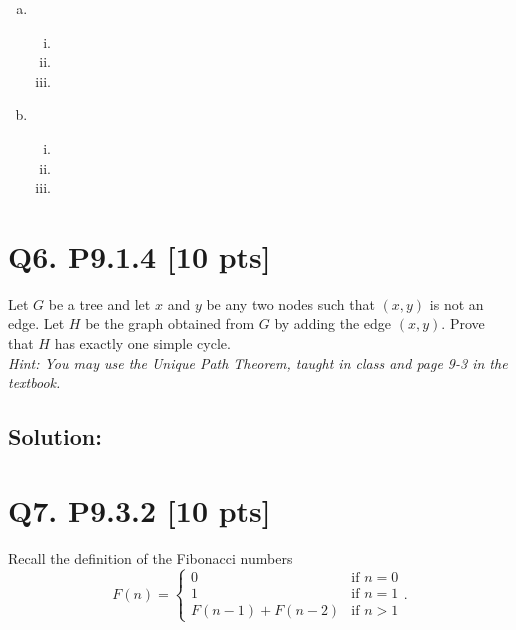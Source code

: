 \documentclass[12pt]{article}
\begin{document}
\begin{enumerate}[(a)]
    \item \ 
        \begin{enumerate}[(i)]
            \item 
            \item 
            \item 
        \end{enumerate}
    \item \ 
        \begin{enumerate}[(i)]
            \item 
            \item 
            \item 
        \end{enumerate}
\end{enumerate}


\newpage

\section*{\textbf{Q6. P9.1.4} [10 pts]}
 Let $G$ be a tree and let $x$ and $y$ be any two nodes such that $(x, y)$ is not an edge. Let $H$ be the graph obtained from $G$ by adding the edge $(x, y)$. Prove that $H$ has exactly one simple cycle. \\

 \noindent \textit{Hint:  You may use the Unique Path Theorem, taught in class and page 9-3 in the textbook.}

 

\medskip


\subsection*{\textbf{Solution:}}

\newpage

\section*{\textbf{Q7. P9.3.2} [10 pts]}

Recall the definition of the Fibonacci numbers
\begin{equation} \label{eq:9.3.2}
F(n) = \begin{cases} 
      0 & \mbox{if $n=0$} \\
      1 & \mbox{if $n=1$} \\
      F(n - 1) + F(n - 2) & \mbox{if $n>1$}
   \end{cases}.
\end{equation}
\end{document}
